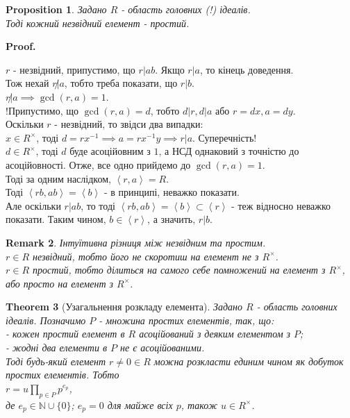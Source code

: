 \documentclass[a4paper, 10pt]{article}
\makeatletter
\theoremstyle{theoremdd}
\newtheorem{theorem}{Theorem}[subsection]
\theoremstyle{theoremdd}
\theoremstyle{theoremdd}
\theoremstyle{theoremdd}
\theoremstyle{theoremdd}
\newtheorem{proposition}[theorem]{Proposition}
\theoremstyle{theoremdd}
\newtheorem{remark}[theorem]{Remark}
\theoremstyle{theoremdd}
\theoremstyle{theoremdd}
\renewenvironment{proof}[1][Proof.\\]{\par
\pushQED{\hfill \qed}%
\normalfont \topsep6\p@\@plus6\p@\relax
\trivlist
\item\relax
{\bfseries
#1\@addpunct{.}}\hspace\labelsep\ignorespaces
}{%
\popQED\endtrivlist\@endpefalse
}
\makeatother
\begin{document}
\begin{proposition}
Задано $R$ - область головних (!) ідеалів.\\
Тоді кожний незвідний елемент - простий.
\end{proposition}

\begin{proof}
$r$ - незвідний, припустимо, що $r | ab$. Якщо $r | a$, то кінець доведення.\\ Тож нехай $r \not | a$, тобто треба показати, що $r | b$.\\
$r \not| a \implies \gcd (r,a) = 1$.\\
!Припустимо, що $\gcd(r,a) = d$, тобто $d | r, d | a$ або $r = dx, a = dy$.\\
Оскільки $r$ - незвідний, то звідси два випадки:\\
$x \in R^\times$, тоді $d = rx^{-1} \implies a = rx^{-1}y \implies r | a$. Суперечність!\\
$d \in R^\times$, тоді $d$ буде асоційовним з $1$, а НСД однаковий з точністю до асоційовності. Отже, все одно прийдемо до $\gcd(r,a) = 1$.\\
Тоді за одним наслідком, $\left<r,a \right> = R$.\\
Тоді $\left<rb,ab \right> = \left< b \right>$ - в принципі, неважко показати.\\
Але оскільки $r | ab$, то тоді $\left<rb,ab \right> = \left< b \right> \subset \left< r \right>$ - теж відносно неважко показати. Таким чином, $b \in \left< r \right>$, а значить, $r | b$.
\end{proof}

\begin{remark}
Інтуїтивна різниця між незвідним та простим.\\
$r \in R$ незвідний, тобто його не скоротиш на елемент не з $R^\times$.\\
$r \in R$ простий, тобто ділиться на самого себе помножений на елемент з $R^\times$, або просто на елемент з $R^\times$.
\end{remark}

\begin{theorem}[Узагальнення розкладу елемента]
Задано $R$ - область головних ідеалів. Позначимо $P$ - множина простих елементів, так, що:\\
- кожен простий елемент в $R$ асоційований з деяким елементом з $P$;\\
- жодні два елементи в $P$ не є асоційованими.\\
Тоді будь-який елемент $r \neq 0 \in R$ можна розкласти единим чином як добуток простих елементів. Тобто\\
$r = u \displaystyle\prod_{p \in P} p^{e_p}$,\\
де $e_p \in \mathbb{N} \cup \{0\}$; $e_p = 0$ для майже всіх $p$, також $u \in R^\times$.
\end{theorem}
\end{document}
